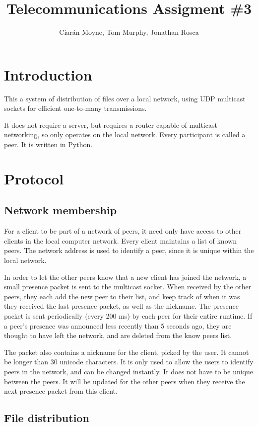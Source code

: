 \documentclass[a4paper, 12pt]{report}
\title{Telecommunications Assigment \#3}
\author{Ciar\'{a}n Moyne, Tom Murphy, Jonathan Rosca}
\begin{document}
\maketitle
\section{Introduction}
This a system of distribution of files over a local network, using UDP multicast sockets for efficient one-to-many transmissions. 

It does not require a server, but requires a router capable of multicast networking, so only operates on the local network. Every participant is called a peer. It is written in Python.

\section{Protocol}
\subsection{Network membership}
For a client to be part of a network of peers, it need only have access to other clients in the local computer network. Every client maintains a list of known peers. The network address is used to identify a peer, since it is unique within the local network.

In order to let the other peers know that a new client has joined the network, a small presence packet is sent to the multicast socket. When received by the other peers, they each add the new peer to their list, and keep track of when it was they received the last presence packet, as well as the nickname. The presence packet is sent periodically (every 200 ms) by each peer for their entire runtime. If a peer's presence was announced less recently than 5 seconds ago, they are thought to have left the network, and are deleted from the know peers list.

The packet also contains a nickname for the client, picked by the user. It cannot be longer than 30 unicode characters. It is only used to allow the users to identify peers in the network, and can be changed instantly. It does not have to be unique between the peers. It will be updated for the other peers when they receive the next presence packet from this client.

\subsection{File distribution}
\end{document}
